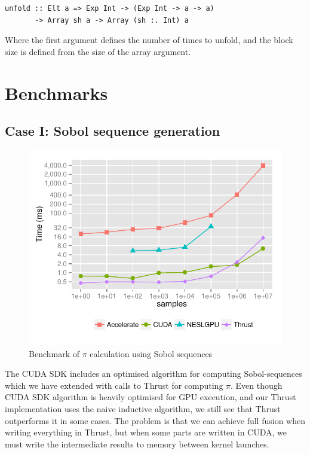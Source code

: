 \documentclass[preprint]{sigplanconf}
\begin{document}
\begin{verbatim}
unfold :: Elt a => Exp Int -> (Exp Int -> a -> a)
       -> Array sh a -> Array (sh :. Int) a
\end{verbatim}
Where the first argument defines the number of times to unfold, and
the block size is defined from the size of the array argument.



\section{Benchmarks}

\subsection{Case I: Sobol sequence generation}
\begin{figure}
  \centering
  \includegraphics[width=\columnwidth]{figures/sobol-time-graph.pdf}
  \caption{Benchmark of $\pi$ calculation using Sobol sequences}
  \label{fig:bench_sobol}
\end{figure}

The CUDA SDK includes an optimised algorithm for computing
Sobol-sequences which we have extended with calls to Thrust for
computing $\pi$. Even though CUDA SDK algorithm is heavily optimised
for GPU execution, and our Thrust implementation uses the naive
inductive algorithm, we still see that Thrust outperforms it in some
cases. The problem is that we can achieve full fusion when writing
everything in Thrust, but when some parts are written in CUDA, we must
write the intermediate results to memory between kernel launches.
\end{document}
